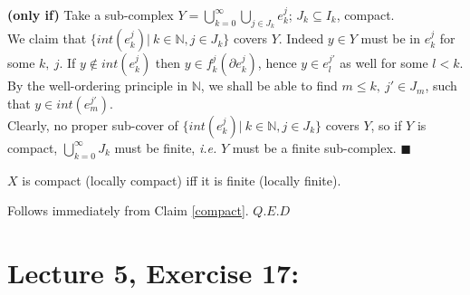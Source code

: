\documentclass[11pt]{article}
\numberwithin{equation}{section}
\begin{document}
\textbf{(only if)} Take a sub-complex $Y=\bigcup^{\infty}_{k=0}{\bigcup_{j\in J_k}{e_k^j}}$; $J_k\subseteq I_k$, compact.\\ We claim that $\{int(e_k^j)|\ k\in\mathbb{N},j\in J_k\}$ covers $Y$. Indeed $y\in Y$ must be in $e_k^j$ for some $k,\ j$. If $y\notin int(e_k^j)$ then $y\in f_k^j(\partial e_k^j)$, hence $y\in e_{l}^{j'}$ as well for some $l<k$. By the {well-ordering principle} in $\mathbb{N}$, we shall be able to find $m\leqslant k,\ j'\in J_m$, such that $y\in int(e_m^{j'})$. \\ Clearly, no proper sub-cover of $\{int(e_k^j)|\ k\in\mathbb{N},j\in J_k\}$ covers $Y$, so if $Y$ is compact, $\bigcup_{k=0}^{\infty}{J_k}$ must be finite, \emph{i.e.} $Y$ must be a finite sub-complex. $\blacksquare$ 
\begin{cor}
     $X$ is compact (locally compact) iff it is finite (locally finite).
\end{cor}
Follows immediately from Claim \ref{compact}. $Q.E.D$

\section{\normalsize{Lecture 5, Exercise 17:}}
\end{document}
